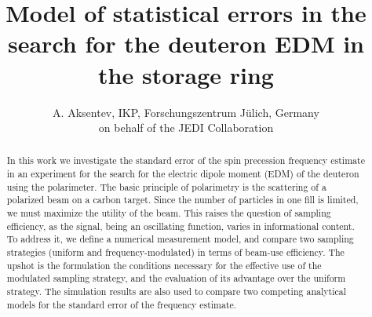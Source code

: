 \documentclass{article}
\begin{document}
	\title{Model of statistical errors in the search for the deuteron EDM in the storage ring}
	\author{A. Aksentev, IKP, Forschungszentrum J\"ulich, Germany\\ on behalf of the JEDI Collaboration}
	\date{}
	\maketitle

\begin{abstract}
In this work we investigate the standard error of the spin precession frequency estimate in an experiment for the search for the electric dipole moment (EDM) of the deuteron using the polarimeter. The basic principle of polarimetry is the scattering of a polarized beam on a carbon target. Since the number of particles in one fill is limited, we must maximize the utility of the beam. This raises the question of sampling efficiency, as the signal, being an oscillating function, varies in informational content. To address it, we define a numerical measurement model, and compare two sampling strategies (uniform and frequency-modulated) in terms of beam-use efficiency. The upshot is the formulation the conditions necessary for the effective use of the modulated sampling strategy, and the evaluation of its advantage over the uniform strategy. The simulation results are also used to compare two competing analytical models for the standard error of the frequency estimate.
\end{abstract}
	
\end{document}
